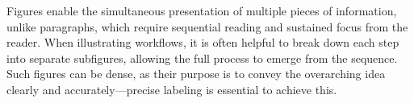 


\noindent
Figures enable the simultaneous presentation of multiple pieces of information, unlike paragraphs, which require sequential reading and sustained focus from the reader.
When illustrating workflows, it is often helpful to break down each step into separate subfigures, allowing the full process to emerge from the sequence.
Such figures can be dense, as their purpose is to convey the overarching idea clearly and accurately—precise labeling is essential to achieve this.
